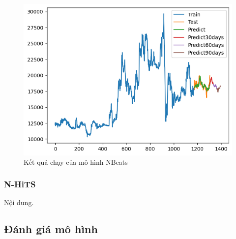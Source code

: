 \begin{figure}[H]
\begin{minipage}{0.15\textwidth}
    \includegraphics[width=1\textwidth]{resources/chapter-5/newdata1/result/EIB_NBeats_9-1.png}
    \end{minipage}
    \hfill
    
    \caption{Kết quả chạy của mô hình NBeats}
    \label{fig:N-BEATS}
\end{figure}

\subsubsection{N-HiTS}
Nội dung.

\subsection{Đánh giá mô hình} 
